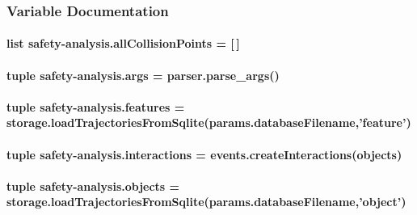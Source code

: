 \subsubsection{Variable Documentation}
\hypertarget{namespacesafety-analysis_ab53934f4c9486b74c7246f4cd76cdadc}{
\paragraph[{all\-Collision\-Points}]{\setlength{\rightskip}{0pt plus 5cm}list safety-\/analysis.\-all\-Collision\-Points = \mbox{[}$\,$\mbox{]}}}\label{namespacesafety-analysis_ab53934f4c9486b74c7246f4cd76cdadc}
\hypertarget{namespacesafety-analysis_a9f08d35d57b8c8de45bf749f286a2583}{
\paragraph[{args}]{\setlength{\rightskip}{0pt plus 5cm}tuple safety-\/analysis.\-args = parser.\-parse\-\_\-args()}}\label{namespacesafety-analysis_a9f08d35d57b8c8de45bf749f286a2583}
\hypertarget{namespacesafety-analysis_ae9335dec1cbe36b77f4b7a9ad2c55220}{
\paragraph[{features}]{\setlength{\rightskip}{0pt plus 5cm}tuple safety-\/analysis.\-features = {\bf storage.\-load\-Trajectories\-From\-Sqlite}(params.\-database\-Filename,'feature')}}\label{namespacesafety-analysis_ae9335dec1cbe36b77f4b7a9ad2c55220}
\hypertarget{namespacesafety-analysis_a5f62d113cdd0f010dea27ffeadbd4f80}{
\paragraph[{interactions}]{\setlength{\rightskip}{0pt plus 5cm}tuple safety-\/analysis.\-interactions = {\bf events.\-create\-Interactions}({\bf objects})}}\label{namespacesafety-analysis_a5f62d113cdd0f010dea27ffeadbd4f80}
\hypertarget{namespacesafety-analysis_abe49e0670b51364da374434e6b2ba136}{
\paragraph[{objects}]{\setlength{\rightskip}{0pt plus 5cm}tuple safety-\/analysis.\-objects = {\bf storage.\-load\-Trajectories\-From\-Sqlite}(params.\-database\-Filename,'object')}}\label{namespacesafety-analysis_abe49e0670b51364da374434e6b2ba136}
